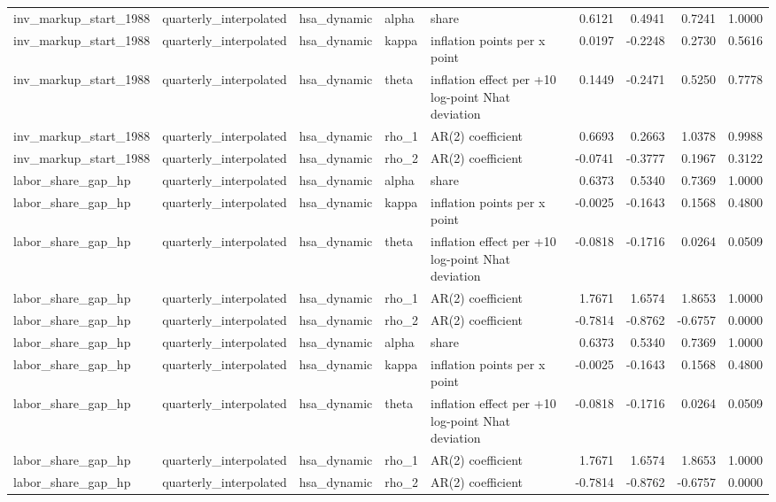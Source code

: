 \begin{tabular}{lllllrrrr}
inv\_markup\_start\_1988 & quarterly\_interpolated & hsa\_dynamic & alpha & share & 0.6121 & 0.4941 & 0.7241 & 1.0000 \\
inv\_markup\_start\_1988 & quarterly\_interpolated & hsa\_dynamic & kappa & inflation points per x point & 0.0197 & -0.2248 & 0.2730 & 0.5616 \\
inv\_markup\_start\_1988 & quarterly\_interpolated & hsa\_dynamic & theta & inflation effect per +10 log-point Nhat deviation & 0.1449 & -0.2471 & 0.5250 & 0.7778 \\
inv\_markup\_start\_1988 & quarterly\_interpolated & hsa\_dynamic & rho\_1 & AR(2) coefficient & 0.6693 & 0.2663 & 1.0378 & 0.9988 \\
inv\_markup\_start\_1988 & quarterly\_interpolated & hsa\_dynamic & rho\_2 & AR(2) coefficient & -0.0741 & -0.3777 & 0.1967 & 0.3122 \\
labor\_share\_gap\_hp & quarterly\_interpolated & hsa\_dynamic & alpha & share & 0.6373 & 0.5340 & 0.7369 & 1.0000 \\
labor\_share\_gap\_hp & quarterly\_interpolated & hsa\_dynamic & kappa & inflation points per x point & -0.0025 & -0.1643 & 0.1568 & 0.4800 \\
labor\_share\_gap\_hp & quarterly\_interpolated & hsa\_dynamic & theta & inflation effect per +10 log-point Nhat deviation & -0.0818 & -0.1716 & 0.0264 & 0.0509 \\
labor\_share\_gap\_hp & quarterly\_interpolated & hsa\_dynamic & rho\_1 & AR(2) coefficient & 1.7671 & 1.6574 & 1.8653 & 1.0000 \\
labor\_share\_gap\_hp & quarterly\_interpolated & hsa\_dynamic & rho\_2 & AR(2) coefficient & -0.7814 & -0.8762 & -0.6757 & 0.0000 \\
labor\_share\_gap\_hp & quarterly\_interpolated & hsa\_dynamic & alpha & share & 0.6373 & 0.5340 & 0.7369 & 1.0000 \\
labor\_share\_gap\_hp & quarterly\_interpolated & hsa\_dynamic & kappa & inflation points per x point & -0.0025 & -0.1643 & 0.1568 & 0.4800 \\
labor\_share\_gap\_hp & quarterly\_interpolated & hsa\_dynamic & theta & inflation effect per +10 log-point Nhat deviation & -0.0818 & -0.1716 & 0.0264 & 0.0509 \\
labor\_share\_gap\_hp & quarterly\_interpolated & hsa\_dynamic & rho\_1 & AR(2) coefficient & 1.7671 & 1.6574 & 1.8653 & 1.0000 \\
labor\_share\_gap\_hp & quarterly\_interpolated & hsa\_dynamic & rho\_2 & AR(2) coefficient & -0.7814 & -0.8762 & -0.6757 & 0.0000 \\

\end{tabular}
